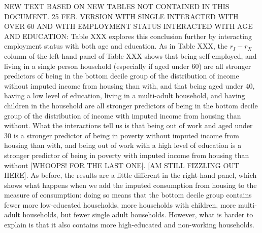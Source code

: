 NEW TEXT BASED ON NEW TABLES NOT CONTAINED IN THIS DOCUMENT. 25 FEB.  VERSION WITH SINGLE INTERACTED WITH OVER 60 AND WITH EMPLOYMENT STATUS INTERACTED WITH AGE AND EDUCATION: Table XXX explores this conclusion further by interacting employment status with both age and education. As in Table XXX, the $r_{I}-r_{X}$ column of the left-hand panel of Table XXX shows that being self-employed, and living in a single person household (especially if aged under 60) are all stronger predictors of being in the bottom decile group of the distribution of income without imputed income from housing than with, and that being aged under 40, having a low level of education, living in a multi-adult household, and having children in the household are all stronger predictors of being in the bottom decile group of the distribution of income with imputed income from housing than without. What the interactions tell us is that being out of work and aged under 30 is a stronger predictor of being in poverty without imputed income from housing than with, and being out of work with a high level of education is a stronger predictor of being in poverty with imputed income from housing  than without [WHOOPS! FOR THE LAST ONE]. [AM STILL FIZZLING OUT HERE]. As before, the results are a little different in the right-hand panel, which shows what happens when we add the imputed consumption from housing to the measure of consumption: doing so means that the bottom decile group contains fewer more low-educated households, more households with children, more multi-adult households, but fewer single adult households. However, what is harder to explain is that it also contains more high-educated and non-working households. 




 
